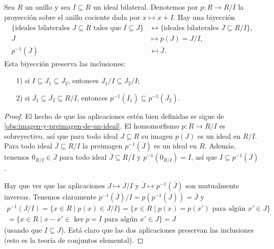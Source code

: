 \begin{teorema}
  Sea $R$ un anillo y sea $I \subseteq R$ un ideal bilateral. Denotemos por
  $p\colon R\to R/I$ la proyección sobre el anillo cociente dada por
  $x \mapsto x + I$. Hay una biyección
  \begin{align*}
    \{ \text{ideales bilaterales } J\subseteq R\text{ tales que }I\subseteq J \} & \leftrightarrow
                                                                                    \{ \text{ideales bilaterales }\overline{J} \subseteq R/I \},\\
    J & \mapsto p (J) = J/I,\\
    p^{-1} (\overline{J}) & \mapsfrom \overline{J}.
  \end{align*}
  Esta biyección preserva las inclusiones:
  \begin{enumerate}
  \item[1)] si $I \subseteq J_1 \subseteq J_2$, entonces
    $J_1/I \subseteq J_2/I$;

  \item[2)] si $\overline{J_1} \subseteq \overline{J_2} \subseteq R/I$, entonces
    $p^{-1} (\overline{I_1}) \subseteq p^{-1} (\overline{J_2})$.
  \end{enumerate}

  \begin{proof}
    El hecho de que las aplicaciones estén bien definidas se sigue
    de \ref{obs:imagen-y-preimagen-de-un-ideal}. El homomorfismo
    $p\colon R\to R/I$ es sobreyectivo, así que para todo ideal $J \subseteq R$
    su imagen $p (J)$ es un ideal en $R/I$. Para todo ideal
    $\overline{J} \subseteq R/I$ la preimagen $p^{-1} (\overline{J})$ es
    un ideal en $R$. Además, tenemos $0_{R/I} \in \overline{J}$ para todo ideal
    $\overline{J} \subseteq R/I$ y $p^{-1} (0_{R/I}) = I$, así que
    $I \subseteq p^{-1} (\overline{J})$.

    Hay que ver que las aplicaciones $J \mapsto J/I$ y
    $\overline{J} \mapsto p^{-1} (\overline{J})$ son mutualmente
    inversas. Tenemos claramente
    $p^{-1} (\overline{J})/I = p (p^{-1} (\overline{J})) = \overline{J}$ y
    \begin{multline*}
      p^{-1} (J/I) =
      \{ x\in R \mid p (x) \in J/I \} =
      \{ x\in R \mid p (x) = p (x') \text{ para algún }x' \in J \} \\
      = \{ x\in R \mid x - x' \in \ker p = I \text{ para algún }x' \in J \} = J
    \end{multline*}
    (usando que $I \subseteq J$). Está claro que las dos aplicaciones preservan
    las inclusiones (esto es la teoría de conjuntos elemental).
  \end{proof}
\end{teorema}

